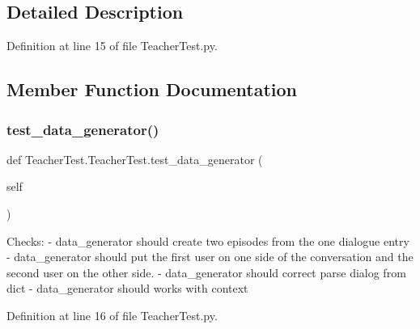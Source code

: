\subsection{Detailed Description}


Definition at line 15 of file Teacher\+Test.\+py.



\subsection{Member Function Documentation}
\mbox{\label{classTeacherTest_1_1TeacherTest_aeb5a6c83bfa0e5eb8d8fad13789421aa}} 
\subsubsection{\texorpdfstring{test\+\_\+data\+\_\+generator()}{test\_data\_generator()}}
{\footnotesize\ttfamily def Teacher\+Test.\+Teacher\+Test.\+test\+\_\+data\+\_\+generator (\begin{DoxyParamCaption}\item[{}]{self }\end{DoxyParamCaption})}

\begin{DoxyVerb}Checks:
- data_generator should create two episodes from the one dialogue entry
- data_generator should put the first user on one side of the
  conversation and the second user on the other side.
- data_generator should correct parse dialog from dict
- data_generator should works with context
\end{DoxyVerb}
 

Definition at line 16 of file Teacher\+Test.\+py.


